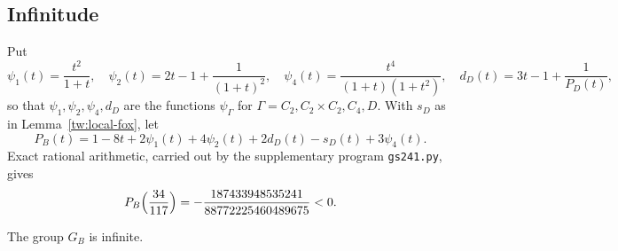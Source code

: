 \subsection{Infinitude}\label{tw:infinite-section}
Put
\begin{equation}\label{tw:costs}
 \psi_1(t)=\frac{t^2}{1+t},\quad
 \psi_2(t)=2t-1+\frac1{(1+t)^2},\quad
 \psi_4(t)=\frac{t^4}{(1+t)(1+t^2)},\quad
 d_D(t)=3t-1+\frac1{P_D(t)},
\end{equation}
so that $\psi_1,\psi_2,\psi_4,d_D$ are the functions $\psi_\Gamma$ for
$\Gamma=C_2,C_2\times C_2,C_4,D$. With $s_D$ as in
Lemma~\ref{tw:local-fox}, let
\begin{equation}\label{tw:PB}
 P_B(t)=1-8t+2\psi_1(t)+4\psi_2(t)+2d_D(t)-s_D(t)+3\psi_4(t).
\end{equation}
Exact rational arithmetic, carried out by the supplementary program
\texttt{gs241.py}, gives
\[
 P_B\Bigl(\frac{34}{117}\Bigr)=-\frac{187433948535241}{88772225460489675}<0.
\]

\begin{proposition}\label{tw:infinite}
The group $G_B$ is infinite.
\end{proposition}

